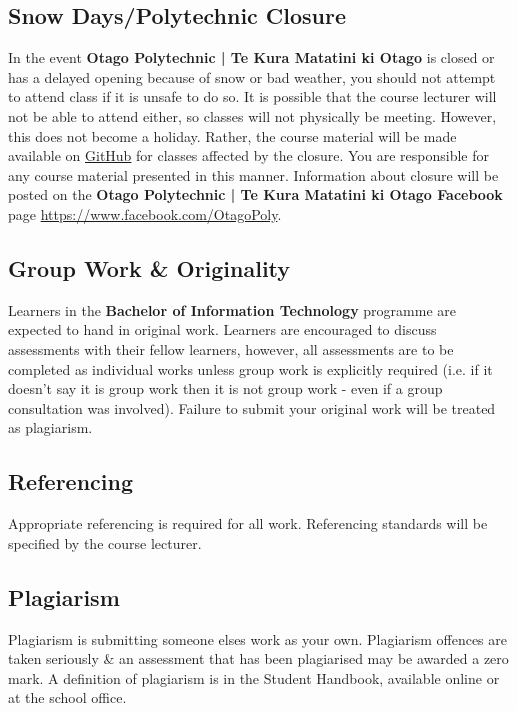 \documentclass{article}
\begin{document}
\subsection*{Snow Days/Polytechnic Closure}
In the event \textbf{Otago Polytechnic | Te Kura Matatini ki Otago} is closed or has a delayed opening because of snow or bad weather, you should not attempt to attend class if it is unsafe to do so. It is possible that the course lecturer will not be able to attend either, so classes will not physically be meeting. However, this does not become a holiday. Rather, the course material will be made available on \href{https://github.com/otago-polytechnic-bit-courses/ID607001-intro-app-dev-concepts}{GitHub} for classes affected by the closure. You are responsible for any course material presented in this manner. Information about closure will be posted on the \textbf{Otago Polytechnic | Te Kura Matatini ki Otago Facebook} page \href{https://www.facebook.com/OtagoPoly}{https://www.facebook.com/OtagoPoly}.

\subsection*{Group Work \& Originality}
Learners in the \textbf{Bachelor of Information Technology} programme are expected to hand in original work. Learners are encouraged to discuss assessments with their fellow learners, however, all assessments are to be completed as individual works unless group work is explicitly required (i.e. if it doesn't say it is group work then it is not group work - even if a group consultation was involved). Failure to submit your original work will be treated as plagiarism.

\subsection*{Referencing}
Appropriate referencing is required for all work. Referencing standards will be specified by the course lecturer.

\subsection*{Plagiarism}
Plagiarism is submitting someone elses work as your own. Plagiarism offences are taken seriously \& an assessment that has been plagiarised may be awarded a zero mark. A definition of plagiarism is in the Student Handbook, available online or at the school office.
\end{document}

